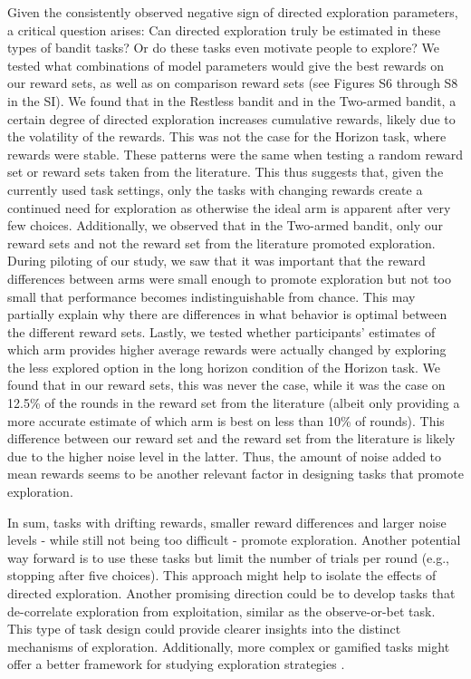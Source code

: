\documentclass[fleqn,10pt]{wlscirep}
\begin{document}
Given the consistently observed negative sign of directed exploration parameters, a critical question arises: Can directed exploration truly be estimated in these types of bandit tasks? Or do these tasks even motivate people to explore? We tested what combinations of model parameters would give the best rewards on our reward sets, as well as on comparison reward sets (see Figures S6 through S8 in the SI). We found that in the Restless bandit and in the Two-armed bandit, a certain degree of directed exploration increases cumulative rewards, likely due to the volatility of the rewards. This was not the case for the Horizon task, where rewards were stable. These patterns were the same when testing a random reward set or reward sets taken from the literature\cite{zajkowski_causal_2017, fan_trait_2023}. This thus suggests that, given the currently used task settings, only the tasks with changing rewards create a continued need for exploration as otherwise the ideal arm is apparent after very few choices. Additionally, we observed that in the Two-armed bandit, only our reward sets and not the reward set from the literature\cite{fan_trait_2023} promoted exploration. During piloting of our study, we saw that it was important that the reward differences between arms were small enough to promote exploration but not too small that performance becomes indistinguishable from chance. This may partially explain why there are differences in what behavior is optimal between the different reward sets. Lastly, we tested whether participants' estimates of which arm provides higher average rewards were actually changed by exploring the less explored option in the long horizon condition of the Horizon task. We found that in our reward sets, this was never the case, while it was the case on 12.5\% of the rounds in the reward set from the literature\cite{zajkowski_causal_2017} (albeit only providing a more accurate estimate of which arm is best on less than 10\% of rounds). This difference between our reward set and the reward set from the literature is likely due to the higher noise level in the latter. Thus, the amount of noise added to mean rewards seems to be another relevant factor in designing tasks that promote exploration.

In sum, tasks with drifting rewards, smaller reward differences and larger noise levels - while still not being too difficult - promote exploration. Another potential way forward is to use these tasks but limit the number of trials per round (e.g., stopping after five choices). This approach might help to isolate the effects of directed exploration. Another promising direction could be to develop tasks that de-correlate exploration from exploitation, similar as the observe-or-bet task\cite{tversky_information_1966, navarro_learning_2016}. This type of task design could provide clearer insights into the distinct mechanisms of exploration. Additionally, more complex or gamified tasks might offer a better framework for studying exploration strategies \cite{allen_using_2024, donegan2023using}.
\end{document}
